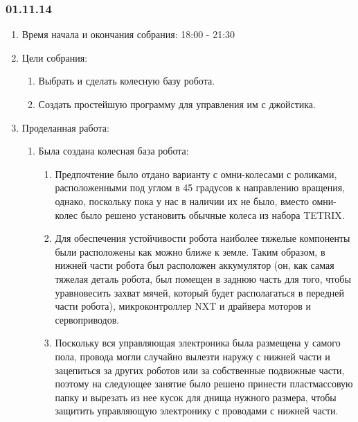 
\subsubsection{01.11.14}

\begin{enumerate}
	\item Время начала и окончания собрания:
	18:00 - 21:30
	\item Цели собрания:
	\begin{enumerate}
		\item Выбрать и сделать колесную базу робота.
		
		\item Создать простейшую программу для управления им с джойстика.
		
	\end{enumerate}
	
	\item Проделанная работа:
	\begin{enumerate}
		\item Была создана колесная база робота:
		\begin{enumerate}
			\item Предпочтение было отдано варианту с омни-колесами с роликами, расположенными под углом в 45 градусов к направлению вращения, однако, поскольку пока у нас в наличии их не было, вместо омни-колес было решено установить обычные колеса из набора TETRIX.
			
			\item Для обеспечения устойчивости робота наиболее тяжелые компоненты были расположены как можно ближе к земле. Таким образом, в нижней части робота был расположен аккумулятор (он, как самая тяжелая деталь робота, был помещен в заднюю часть для того, чтобы уравновесить захват мячей, который будет располагаться в передней части робота), микроконтроллер NXT и драйвера моторов и сервоприводов.
			
			\item Поскольку вся управляющая электроника была размещена у самого пола, провода могли случайно вылезти наружу с нижней части и зацепиться за других роботов или за собственные подвижные части, поэтому на следующее занятие было решено принести пластмассовую папку и вырезать из нее кусок для днища нужного размера, чтобы защитить управляющую электронику с проводами с нижней части.
			

\end{enumerate}
\end{enumerate}
\end{enumerate}

